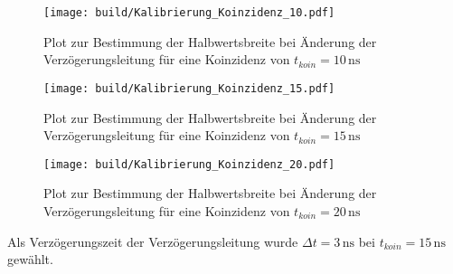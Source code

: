 \begin{figure}[H]
    \centering
    \texttt{[image: build/Kalibrierung\_Koinzidenz\_10.pdf]}
    \caption{Plot zur Bestimmung der Halbwertsbreite bei Änderung der Verzögerungsleitung für eine Koinzidenz von $t_{koin} = 10 \, \unit{\nano\second}$}
    \label{fig:koin_10}
\end{figure}

\begin{figure}[H]
    \centering
    \texttt{[image: build/Kalibrierung\_Koinzidenz\_15.pdf]}
    \caption{Plot zur Bestimmung der Halbwertsbreite bei Änderung der Verzögerungsleitung für eine Koinzidenz von $t_{koin} = 15 \, \unit{\nano\second}$}
    \label{fig:koin_15}
\end{figure}

\begin{figure}[H]
    \centering
    \texttt{[image: build/Kalibrierung\_Koinzidenz\_20.pdf]}
    \caption{Plot zur Bestimmung der Halbwertsbreite bei Änderung der Verzögerungsleitung für eine Koinzidenz von $t_{koin} = 20 \, \unit{\nano\second}$}
    \label{fig:koin_20}
\end{figure}

Als Verzögerungszeit der Verzögerungsleitung wurde $\Delta t = 3 \,\unit{\nano\second}$ bei $t_{koin} = 15 \, \unit{\nano\second}$ gewählt.


